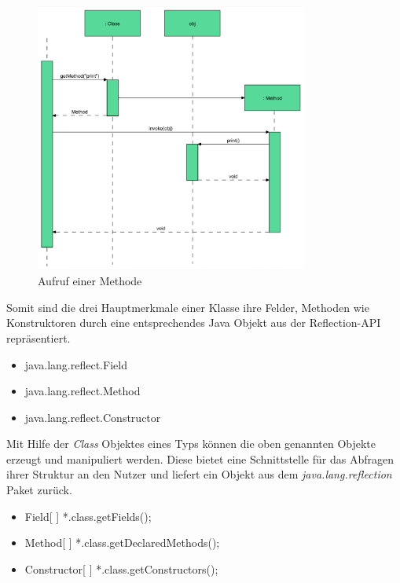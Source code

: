   \begin{figure}[h!]
    \centering
    \includegraphics[width=0.8\textwidth]{material/images/reflection-flussdiagram.png}
    \caption{Aufruf einer Methode}
    \label{fig:reflection-fluss}
  \end{figure}

  \newpage Somit sind die drei Hauptmerkmale einer Klasse ihre Felder, Methoden wie Konstruktoren durch eine entsprechendes Java Objekt aus der Reflection-API repräsentiert. 
  \begin{itemize}
    \item java.lang.reflect.Field
    \item java.lang.reflect.Method
    \item java.lang.reflect.Constructor
  \end{itemize}
  Mit Hilfe der \textit{Class} Objektes eines Typs können die oben genannten Objekte erzeugt und manipuliert werden. Diese bietet eine Schnittstelle für das Abfragen ihrer Struktur an den Nutzer und liefert ein Objekt aus dem \textit{java.lang.reflection} Paket zurück.
  \begin{itemize}
    \item Field[ ] *.class.getFields();
    \item Method[ ] *.class.getDeclaredMethods();
    \item Constructor[ ] *.class.getConstructors();
  \end{itemize}

